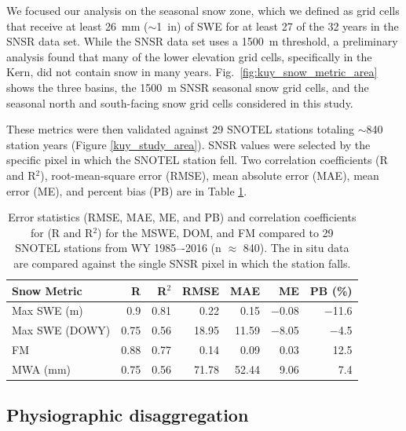 We focused our analysis on the seasonal snow zone, which we defined as grid cells that receive at least 26~mm ($\sim$1~in) of SWE for at least 27 of the 32 years in the SNSR data set. While the SNSR data set uses a 1500~m threshold, a preliminary analysis found that many of the lower elevation grid cells, specifically in the Kern, did not contain snow in many years. Fig.~\ref{fig:kuy_snow_metric_area} shows the three basins, the 1500~m SNSR seasonal snow grid cells, and the seasonal north and south-facing snow grid cells considered in this study.

These metrics were then validated against 29 SNOTEL stations totaling $\sim$840 station years (Figure \ref{kuy_study_area}). SNSR values were selected by the specific pixel in which the SNOTEL station fell. Two correlation coefficients (R and R$^{2}$), root-mean-square error (RMSE), mean absolute error (MAE), mean error (ME), and percent bias (PB) are in Table \ref{tab:snow_metrics_val_table}.


\begin{table}[htbp]
  \centering
  \caption{Error statistics (RMSE, MAE, ME, and PB) and correlation coefficients for (R and R$^{2}$) for the MSWE, DOM, and FM compared to 29 SNOTEL stations from WY 1985–-2016 (n $\approx$ 840). The in situ data are compared against the single SNSR pixel in which the station falls.}
  \label{tab:snow_metrics_val_table}
  \begin{tabular}{lrrrrrr}
    \toprule
    Snow Metric & R & R$^{2}$ & RMSE & MAE & ME & PB (\%) \\
    \midrule
    Max SWE (m) & 0.9 & 0.81 & 0.22 & 0.15 & $-$0.08 & $-$11.6 \\
    Max SWE (DOWY) & 0.75 & 0.56 & 18.95 & 11.59 & $-$8.05 & $-$4.5 \\
    FM & 0.88 & 0.77 & 0.14 & 0.09 & 0.03 & 12.5 \\
    MWA (mm) & 0.75 & 0.56 & 71.78 & 52.44 & 9.06 & 7.4 \\
    \bottomrule
  \end{tabular}
\end{table}

\hypertarget{ch2-methods-2}{\subsection{Physiographic disaggregation}\label{ch2-methods-2}}

